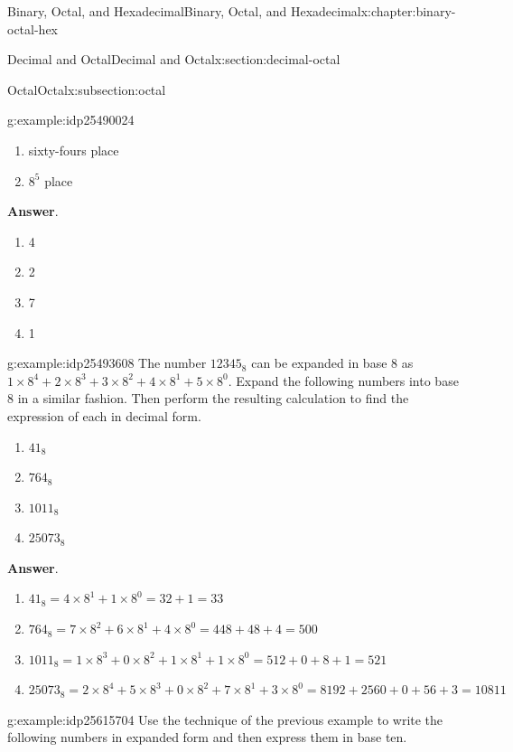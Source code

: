 \documentclass[twoside,10pt,]{book}
\newcommand{\blocktitlefont}{\relax}
\numberwithin{equation}{section}
\begin{document}
\begin{chapterptx}{Binary, Octal, and Hexadecimal}{}{Binary, Octal, and Hexadecimal}{}{}{x:chapter:binary-octal-hex}
\begin{sectionptx}{Decimal and Octal}{}{Decimal and Octal}{}{}{x:section:decimal-octal}
\begin{subsectionptx}{Octal}{}{Octal}{}{}{x:subsection:octal}
\begin{example}{}{g:example:idp25490024}
\begin{enumerate}
\item{}sixty-fours place%
\item{}\(8^5\) place%
\end{enumerate}
%
\par\smallskip%
\noindent\textbf{\blocktitlefont Answer}.\label{g:answer:idp25494632}{}\hypertarget{g:answer:idp25494632}{}\quad{}%
\begin{enumerate}
\item{}4%
\item{}2%
\item{}7%
\item{}1%
\end{enumerate}
%
\end{example}
\begin{example}{}{g:example:idp25493608}%
The number \(12345_8\) can be expanded in base 8 as \(1\times 8^4+2\times 8^3+3\times 8^2+4\times 8^1+5\times 8^0\).  Expand the following numbers into base 8 in a similar fashion.  Then perform the resulting calculation to find the expression of each in decimal form.%
\begin{enumerate}
\item{}\(\displaystyle 41_8\)%
\item{}\(\displaystyle 764_8\)%
\item{}\(\displaystyle 1011_8\)%
\item{}\(\displaystyle 25073_8\)%
\end{enumerate}
%
\par\smallskip%
\noindent\textbf{\blocktitlefont Answer}.\label{g:answer:idp25615320}{}\hypertarget{g:answer:idp25615320}{}\quad{}%
\begin{enumerate}
\item{}\(\displaystyle 41_8=4\times 8^1+1\times 8^0=32+1=33\)%
\item{}\(\displaystyle 764_8=7\times 8^2+6\times 8^1+4\times 8^0=448+48+4=500\)%
\item{}\(\displaystyle 1011_8=1\times 8^3+0\times 8^2+1\times 8^1+1\times 8^0=512+0+8+1=521\)%
\item{}\(\displaystyle 25073_8=2\times 8^4+5\times 8^3+0\times 8^2+7\times 8^1+3\times 8^0=8192+2560+0+56+3=10811\)%
\end{enumerate}
%
\end{example}
\begin{example}{}{g:example:idp25615704}%
Use the technique of the previous example to write the following numbers in expanded form and then express them in base ten.%
\begin{enumerate}

\end{enumerate}
\end{example}
\end{subsectionptx}
\end{sectionptx}
\end{chapterptx}
\end{document}
